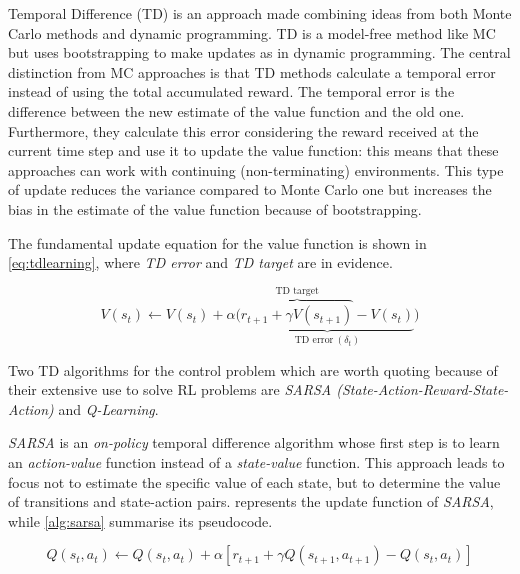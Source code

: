 Temporal Difference (TD) is an approach made combining ideas from both Monte Carlo methods and dynamic programming. TD is a model-free method like MC but uses bootstrapping to make updates as in dynamic programming. The central distinction from MC approaches is that TD methods calculate a temporal error instead of using the total accumulated reward. The temporal error is the difference between the new estimate of the value function and the old one. Furthermore, they calculate this error considering the reward received at the current time step and use it to update the value function: this means that these approaches can work with continuing (non-terminating) environments.
This type of update reduces the variance compared to Monte Carlo one but increases the bias in the estimate of the value function because of bootstrapping.

The fundamental update equation for the value function is shown in \vref{eq:tdlearning}, where \textit{TD error} and \textit{TD target} are in evidence.

 \begin{equation}\label{eq:tdlearning}
	V(s_t) \leftarrow V(s_t) + \alpha \big(\underbrace{\overbrace{r_{t+1} + \gamma V(s_{t+1})}^{\text{TD target}}- V(s_t)}_{\text{TD error} \ (\delta_t)}\big)
\end{equation}

Two TD algorithms for the control problem which are worth quoting because of their extensive use to solve RL problems are \textit{SARSA (State-Action-Reward-State-Action)} and \textit{Q-Learning}.

\textit{SARSA} is an \textit{on-policy} temporal difference algorithm whose first step is to learn an \textit{action-value} function instead of a \textit{state-value} function. This approach leads to focus not to estimate the specific value of each state, but to determine the value of transitions and state-action pairs.  represents the update function of \textit{SARSA}, while \vref{alg:sarsa} summarise its pseudocode.

\begin{equation}\label{eq:sarsa}
Q(s_t, a_t) \leftarrow Q(s_t, a_t) + \alpha [r_{t+1} + \gamma Q(s_{t+1}, a_{t+1}) - Q(s_t, a_t)]
\end{equation}

